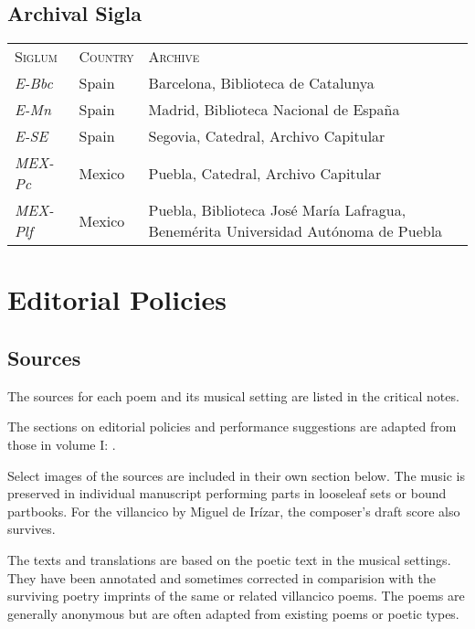 \subsection{Archival Sigla}

\begin{tabulary}{\textwidth}{llL}
    \textsc{Siglum} & \textsc{Country} & \textsc{Archive} \\

    \emph{E-Bbc}
    & Spain
    & Barcelona, Biblioteca de Catalunya \\

    \emph{E-Mn}
    & Spain
    & Madrid, Biblioteca Nacional de España \\

    \emph{E-SE}
    & Spain
    & Segovia, Catedral, Archivo Capitular \\

    \emph{MEX-Pc}
    & Mexico
    & Puebla, Catedral, Archivo Capitular \\

    \emph{MEX-Plf}
    & Mexico
    & Puebla, Biblioteca José María Lafragua, Benemérita Universidad Autónoma
    de Puebla \\
\end{tabulary}


\section{Editorial Policies}

\subsection{Sources}
The sources for each poem and its musical setting are listed in the 
critical notes.%
\begin{Footnote}
    The sections on editorial policies and performance suggestions are adapted
    from those in volume I: \autocite[5--11]{Cashner:WLSCM32}.
\end{Footnote}
Select images of the sources are included in their own section below.
The music is preserved in individual manuscript performing parts in looseleaf 
sets or bound partbooks.
For the villancico by Miguel de Irízar, the composer's draft score also 
survives.

The texts and translations are based on the poetic text in the musical settings.
They have been annotated and sometimes corrected in comparision with the 
surviving poetry imprints of the same or related villancico poems.
The poems are generally anonymous but are often adapted from existing poems or 
poetic types.

